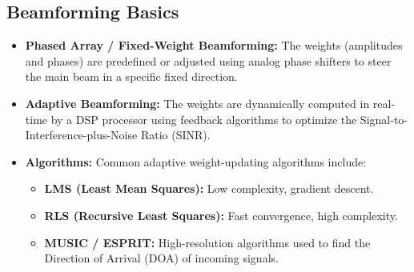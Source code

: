 \documentclass[12pt,a4paper]{article}
\begin{document}
\begin{tcolorbox}[tikzbox, title={Smart Antenna Receiver Block Diagram}]
\end{tcolorbox}

\subsection{Beamforming Basics}
\begin{itemize}[leftmargin=*, itemsep=3pt]
  \item \textbf{Phased Array / Fixed-Weight Beamforming:} The weights (amplitudes and phases) are predefined or adjusted using analog phase shifters to steer the main beam in a specific fixed direction.
  \item \textbf{Adaptive Beamforming:} The weights are dynamically computed in real-time by a DSP processor using feedback algorithms to optimize the Signal-to-Interference-plus-Noise Ratio (SINR).
  \item \textbf{Algorithms:} Common adaptive weight-updating algorithms include:
    \begin{itemize}[leftmargin=*, itemsep=1pt]
      \item \textbf{LMS (Least Mean Squares):} Low complexity, gradient descent.
      \item \textbf{RLS (Recursive Least Squares):} Fast convergence, high complexity.
      \item \textbf{MUSIC / ESPRIT:} High-resolution algorithms used to find the Direction of Arrival (DOA) of incoming signals.
    \end{itemize}
\end{itemize}
\end{document}
